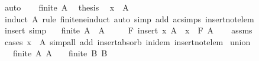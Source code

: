 \begin{isabellebody}
\ auto\isanewline
\ \ \isamarkupfalse%
\ {\isacartoucheopen}finite\ A{\isacartoucheclose}\ \isamarkupfalse%
\ {\isacharquery}{\kern0pt}thesis\ \isamarkupfalse%
\ {\isacartoucheopen}x\ {\isasymin}\ A{\isacartoucheclose}\isanewline
\ \ \ \ \isamarkupfalse%
\ {\isacharparenleft}{\kern0pt}induct\ A\ rule{\isacharcolon}{\kern0pt}\ finite{\isacharunderscore}{\kern0pt}ne{\isacharunderscore}{\kern0pt}induct{\isacharparenright}{\kern0pt}\ {\isacharparenleft}{\kern0pt}auto\ simp\ add{\isacharcolon}{\kern0pt}\ ac{\isacharunderscore}{\kern0pt}simps\ insert{\isacharunderscore}{\kern0pt}not{\isacharunderscore}{\kern0pt}elem{\isacharparenright}{\kern0pt}\isanewline
{}\isamarkupfalse%
%
\endisatagproof
{\isafoldproof}%
%
\isadelimproof
\isanewline
%
\endisadelimproof
\isanewline
{}\isamarkupfalse%
\ insert\ {\isacharbrackleft}{\kern0pt}simp{\isacharbrackright}{\kern0pt}{\isacharcolon}{\kern0pt}\isanewline
\ \ \ {\isachardoublequoteopen}finite\ A{\isachardoublequoteclose}\ \ {\isachardoublequoteopen}A\ {\isasymnoteq}\ {\isacharbraceleft}{\kern0pt}{\isacharbraceright}{\kern0pt}{\isachardoublequoteclose}\isanewline
\ \ \ {\isachardoublequoteopen}F\ {\isacharparenleft}{\kern0pt}insert\ x\ A{\isacharparenright}{\kern0pt}\ {\isacharequal}{\kern0pt}\ x\ \isactrlbold {\isacharasterisk}{\kern0pt}\ F\ A{\isachardoublequoteclose}\isanewline
%
\isadelimproof
\ \ %
\endisadelimproof
%
\isatagproof
{}\isamarkupfalse%
\ assms\ \isamarkupfalse%
\ {\isacharparenleft}{\kern0pt}cases\ {\isachardoublequoteopen}x\ {\isasymin}\ A{\isachardoublequoteclose}{\isacharparenright}{\kern0pt}\ {\isacharparenleft}{\kern0pt}simp{\isacharunderscore}{\kern0pt}all\ add{\isacharcolon}{\kern0pt}\ insert{\isacharunderscore}{\kern0pt}absorb\ in{\isacharunderscore}{\kern0pt}idem\ insert{\isacharunderscore}{\kern0pt}not{\isacharunderscore}{\kern0pt}elem{\isacharparenright}{\kern0pt}%
\endisatagproof
{\isafoldproof}%
%
\isadelimproof
\isanewline
%
\endisadelimproof
\isanewline
{}\isamarkupfalse%
\ union{\isacharcolon}{\kern0pt}\isanewline
\ \ \ {\isachardoublequoteopen}finite\ A{\isachardoublequoteclose}\ {\isachardoublequoteopen}A\ {\isasymnoteq}\ {\isacharbraceleft}{\kern0pt}{\isacharbraceright}{\kern0pt}{\isachardoublequoteclose}\ \ {\isachardoublequoteopen}finite\ B{\isachardoublequoteclose}\ {\isachardoublequoteopen}B\ {\isasymnoteq}\ {\isacharbraceleft}{\kern0pt}{\isacharbraceright}{\kern0pt}{\isachardoublequoteclose}\isanewline

\end{isabellebody}
